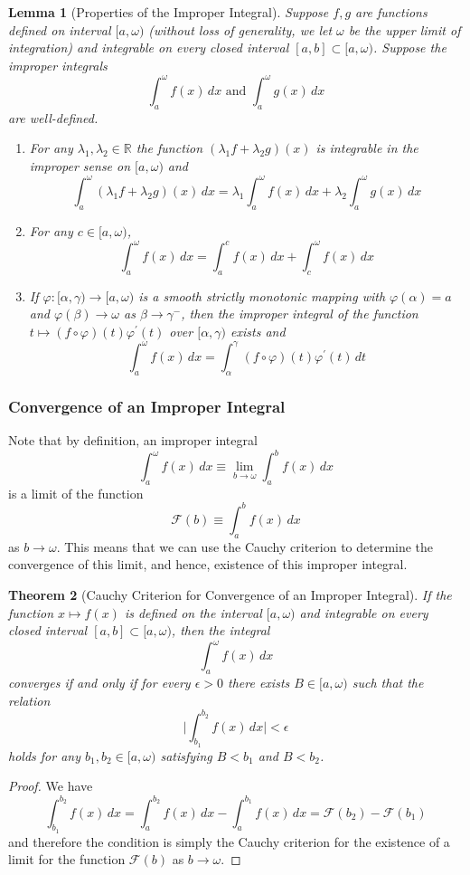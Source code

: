 \documentclass{article}
\newtheorem{theorem}{Theorem}[section]
\newtheorem{lemma}[theorem]{Lemma}
\theoremstyle{remark}
\theoremstyle{definition}
\begin{document}
\begin{lemma}[Properties of the Improper Integral]
Suppose $f, g$ are functions defined on interval $[a, \omega)$ (without loss of generality, we let $\omega$ be the upper limit of integration) and integrable on every closed interval $[a, b] \subset [a, \omega)$. Suppose the improper integrals 
\[\int_a^\omega f(x)\,dx \text{ and } \int_a^\omega g(x)\,dx\]
are well-defined. 
\begin{enumerate}
    \item For any $\lambda_1, \lambda_2 \in \mathbb{R}$ the function $(\lambda_1 f + \lambda_2 g)(x)$ is integrable in the improper sense on $[a, \omega)$ and
    \[\int_a^\omega (\lambda_1 f + \lambda_2 g)(x)\,dx = \lambda_1 \int_a^\omega f(x)\,dx + \lambda_2 \int_a^\omega g(x)\,dx\]
    \item For any $c \in [a, \omega)$, 
    \[\int_a^\omega f(x)\,dx = \int_a^c f(x)\,dx + \int_c^\omega f(x)\,dx\]
    \item If $\varphi: [\alpha, \gamma) \longrightarrow [a, \omega)$ is a smooth strictly monotonic mapping with $\varphi(\alpha) = a$ and $\varphi(\beta) \rightarrow \omega$ as $\beta \rightarrow \gamma^-$, then the improper integral of the function $t \mapsto (f \circ \varphi)(t) \varphi^\prime (t)$ over $[\alpha, \gamma)$ exists and 
    \[\int_a^\omega f(x)\,dx = \int_\alpha^\gamma (f \circ \varphi)(t) \varphi^\prime (t)\,dt\]
\end{enumerate}
\end{lemma}

\subsubsection{Convergence of an Improper Integral}
Note that by definition, an improper integral 
\[\int_a^\omega f(x)\,dx \equiv \lim_{b \rightarrow \omega} \int_a^b f(x) \,dx\]
is a limit of the function 
\[\mathcal{F}(b) \equiv \int_a^b f(x)\,dx\]
as $b \rightarrow \omega$. This means that we can use the Cauchy criterion to determine the convergence of this limit, and hence, existence of this improper integral. 

\begin{theorem}[Cauchy Criterion for Convergence of an Improper Integral]
If the function $x \mapsto f(x)$ is defined on the interval $[a, \omega)$ and integrable on every closed interval $[a, b] \subset [a, \omega)$, then the integral 
\[\int_a^\omega f(x)\,dx\]
converges if and only if for every $\epsilon > 0$ there exists $B \in [a, \omega)$ such that the relation
\[\Bigg| \int_{b_1}^{b_2} f(x)\,dx \bigg| < \epsilon\]
holds for any $b_1, b_2 \in [a, \omega)$ satisfying $B < b_1$ and $B < b_2$. 
\end{theorem}
\begin{proof}
We have
\[\int_{b_1}^{b_2} f(x)\,dx = \int_a^{b_2} f(x)\,dx - \int_a^{b_1} f(x)\,dx = \mathcal{F}(b_2) - \mathcal{F}(b_1)\]
and therefore the condition is simply the Cauchy criterion for the existence of a limit for the function $\mathcal{F}(b)$ as $b \rightarrow \omega$. 
\end{proof}
\end{document}
